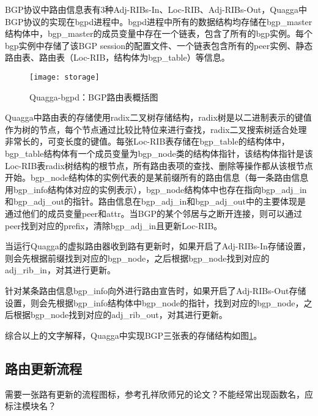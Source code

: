 BGP协议中路由信息表有3种Adj-RIBs-In、Loc-RIB、Adj-RIBs-Out，Quagga中BGP协议的实现在bgpd进程中。bgpd进程中所有的数据结构均存储在bgp\_master结构体中，bgp\_master的成员变量中存在一个链表，包含了所有的bgp实例。每个bgp实例中存储了该BGP session的配置文件、一个链表包含所有的peer实例、静态路由表、路由表（Loc-RIB，结构体为bgp\_table）等信息。


\begin{figure}
  \centering
  \texttt{[image: storage]}
  \caption{Quagga-bgpd：BGP路由表概括图\cite{jakma2014quagga}}
  \label{fig:storage}
\end{figure}

Quagga中路由表的存储使用radix二叉树\cite{quaggaThesis}存储结构，radix树是以二进制表示的键值作为树的节点，每个节点通过比较比特位来进行查找，radix二叉搜索树适合处理非常长的，可变长度的键值。每张Loc-RIB表存储在bgp\_table的结构体中，bgp\_table结构体有一个成员变量为bgp\_node类的结构体指针，该结构体指针是该Loc-RIB表radix树结构的根节点，所有路由表项的查找、删除等操作都从该根节点开始。bgp\_node结构体的实例代表的是某前缀所有的路由信息（每一条路由信息用bgp\_info结构体对应的实例表示），bgp\_node结构体中也存在指向bgp\_adj\_in和bgp\_adj\_out的指针。路由信息在bgp\_adj\_in和bgp\_adj\_out中的主要体现是通过他们的成员变量peer和attr。当BGP的某个邻居与之断开连接，则可以通过peer找到对应的prefix，清除bgp\_adj\_in且更新Loc-RIB。

当运行Quagga的虚拟路由器收到路有更新时，如果开启了Adj-RIBs-In存储设置，则会先根据前缀找到对应的bgp\_node，之后根据bgp\_node找到对应的adj\_rib\_in，对其进行更新。

针对某条路由信息bgp\_info向外进行路由宣告时，如果开启了Adj-RIBs-Out存储设置，则会先根据bgp\_info结构体中bgp\_node的指针，找到对应的bgp\_node，之后根据bgp\_node找到对应的adj\_rib\_out，对其进行更新。

综合以上的文字解释，Quagga中实现BGP三张表的存储结构如图\ref{fig:storage}。
\subsection{路由更新流程}

需要一张路有更新的流程图标，参考孔祥欣师兄的论文？不能经常出现函数名，应标注模块名？

